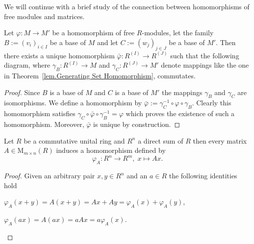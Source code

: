 We will continue with a brief study of the connection between homomorphisms of free modules and matrices.

\begin{prop}\label{prop.Commutative Diagram of Free Modules}
Let $\varphi\colon M\to M'$ be a homomorphism of free $R$-modules, let the family $B:=(v_i)_{i\in I}$ be a base of $M$ and let $C:=(w_j)_{j\in J}$ be a base of $M'$. Then there exists a unique homomorphism $\bar{\varphi}\colon R^{(I)}\to R^{(J)}$ such that the following diagram, where $\gamma_B\colon R^{(I)}\to M$ and $\gamma_C\colon R^{(J)}\to M'$ denote mappings like the one in Theorem~\ref{lem.Generating Set Homomorphism}, commutates.
\begin{center}
\end{center}
\end{prop}
\begin{proof}
Since $B$ is a base of $M$ and $C$ is a base of $M'$ the mappings $\gamma_B$ and $\gamma_C$ are isomorphisms. We define a homomorphism by $\bar{\varphi}:=\gamma_C^{-1}\circ\varphi\circ\gamma_B$. Clearly this homomorphism satisfies $\gamma_C\circ\bar{\varphi}\circ\gamma_B^{-1}=\varphi$ which proves the existence of such a homomorphism. Moreover, $\bar{\varphi}$ is unique by construction.
\end{proof}

\begin{cor}\label{cor.Matrix implies Homomorphism}
Let $R$ be a commutative unital ring and $R^n$ a direct sum of $R$ then every matrix $A\in\mathrm{M}_{m\times n}(R)$ induces a homomorphism defined by
\begin{equation*}
\varphi_A\colon R^n\to R^m,\; x\mapsto Ax.
\end{equation*}
\end{cor}
\begin{proof}
Given an arbitrary pair $x,y\in R^n$ and an $a\in R$ the following identities hold
\begin{compactenum}
\item $\varphi_A(x+y)=A(x+y)=Ax+Ay=\varphi_A(x)+\varphi_A(y)$,
\item $\varphi_A(ax)=A(ax)=aAx=a\varphi_A(x)$.
\end{compactenum}
\end{proof}

